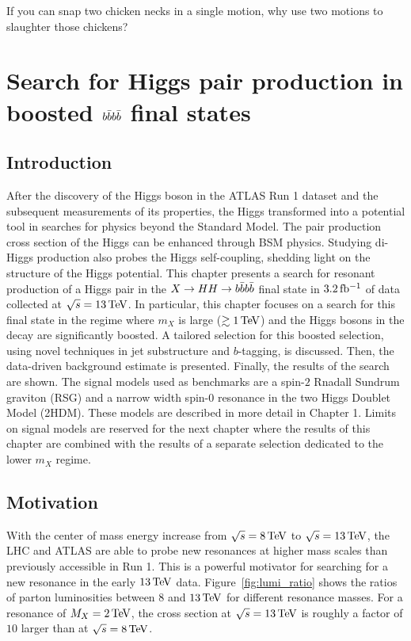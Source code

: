 \begin{savequote}[75mm]
If you can snap two chicken necks in a single motion, why use two motions to slaughter those chickens?
\end{savequote}

\chapter{Search for Higgs pair production in boosted $b\bar{b}b\bar{b}$ final states}
\label{chap:boosted4b}

\section{Introduction}

After the discovery of the Higgs boson in the ATLAS Run 1 dataset and the subsequent measurements of its properties, the Higgs transformed into a potential tool in searches for physics beyond the Standard Model. The pair production cross section of the Higgs can be enhanced through BSM physics. Studying di-Higgs production also probes the Higgs self-coupling, shedding light on the structure of the Higgs potential. This chapter presents a search for resonant production of a Higgs pair in the $X\to HH \to b\bar{b}b\bar{b}$ final state in $3.2 \mbox{\,fb$^{-1}$}$ of data collected at $\sqrt{s} = 13 \TeV$. In particular, this chapter focuses on a search for this final state in the regime where $m_{X}$ is large ($\gtrsim 1 \TeV$) and the Higgs bosons in the decay are significantly boosted. A tailored selection for this boosted selection, using novel techniques in jet substructure and $b$-tagging, is discussed. Then, the data-driven background estimate is presented. Finally, the results of the search are shown. The signal models used as benchmarks are a spin-$2$ Rnadall Sundrum graviton (RSG) and a narrow width spin-$0$ resonance in the two Higgs Doublet Model (2HDM). These models are described in more detail in Chapter 1. Limits on signal models are reserved for the next chapter where the results of this chapter are combined with the results of a separate selection dedicated to the lower $m_X$ regime. 

\section{Motivation}

With the center of mass energy increase from $\sqrt{s} = 8 \TeV$ to $\sqrt{s} = 13 \TeV$, the LHC and ATLAS are able to probe new resonances at higher mass scales than previously accessible in Run 1. This is a powerful motivator for searching for a new resonance in the early $13 \TeV$ data. Figure~\ref{fig:lumi_ratio} shows the ratios of parton luminosities between $8$ and $13 \TeV$ for different resonance masses. For a resonance of $M_{X} = 2 \TeV$, the cross section at $\sqrt{s} = 13 \TeV$ is roughly a factor of $10$ larger than at $\sqrt{s} = 8 \TeV$. 

